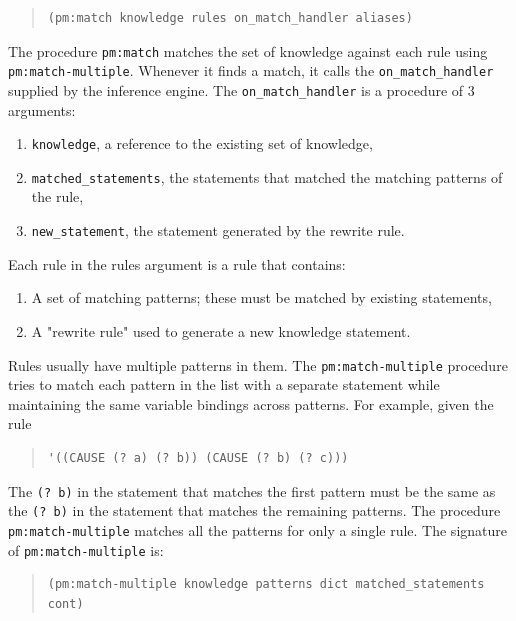 \documentclass[11pt]{article}
\begin{document}
\begin{quote}
\begin{verbatim}
(pm:match knowledge rules on_match_handler aliases)
\end{verbatim}
\end{quote}

The procedure \texttt{pm:match} matches the set of knowledge against each rule using \texttt{pm:match-multiple}. Whenever it finds a match, it calls the \texttt{on\_match\_handler} supplied by the inference engine. The \texttt{on\_match\_handler} is a procedure of 3 arguments:

\begin{enumerate}
\item \texttt{knowledge}, a reference to the existing set of knowledge,
\item \texttt{matched\_statements}, the statements that matched the matching patterns of the rule,
\item \texttt{new\_statement}, the statement generated by the rewrite rule.
\end{enumerate}

Each rule in the rules argument is a rule that contains:
\begin{enumerate}
\item A set of matching patterns; these must be matched by existing statements,
\item A "rewrite rule" used to generate a new knowledge statement.
\end{enumerate}

Rules usually have multiple patterns in them. The \texttt{pm:match-multiple} procedure tries to match each pattern in the list with  a separate statement while maintaining the same variable bindings across patterns. For example, given the rule

\begin{quote}
\begin{verbatim}
'((CAUSE (? a) (? b)) (CAUSE (? b) (? c)))
\end{verbatim}
\end{quote}

The \texttt{(? b)} in the statement that matches the first pattern must be the same as the \texttt{(? b)} in the statement that matches the remaining patterns. The procedure \texttt{pm:match-multiple} matches all the patterns for only a single rule. The signature of \texttt{pm:match-multiple} is:

\begin{quote}
\begin{verbatim}
(pm:match-multiple knowledge patterns dict matched_statements cont)
\end{verbatim}
\end{quote}
\end{document}
